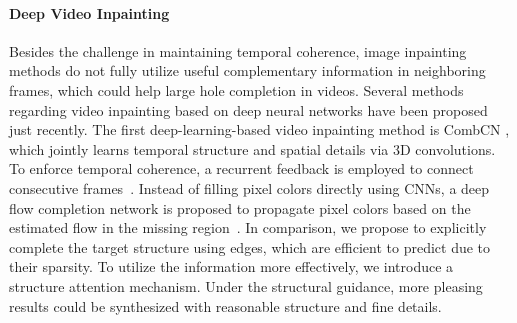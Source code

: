 \paragraph{Deep Video Inpainting}
Besides the challenge in maintaining temporal coherence, image inpainting methods do not fully utilize useful complementary information in neighboring frames, which could help large hole completion in videos.
Several methods regarding video inpainting based on deep neural networks have been proposed just recently.
%
The first deep-learning-based video inpainting method is CombCN \cite{wang2019video}, which jointly learns temporal structure and spatial details via 3D convolutions.
%
To enforce temporal coherence, a recurrent feedback is employed to connect consecutive frames~\cite{Kim_2019_CVPR,Kim_2019_CVPR1}. 
Instead of filling pixel colors directly using CNNs, a deep flow completion network is proposed to propagate pixel colors based on the estimated flow in the missing region~\cite{Xu_2019_CVPR}.
%
In comparison, we propose to explicitly complete the target structure using edges, which are efficient to predict due to their sparsity. To utilize the information more effectively, we introduce a structure attention mechanism. 
Under the structural guidance, more pleasing results could be synthesized with reasonable structure and fine details. 































